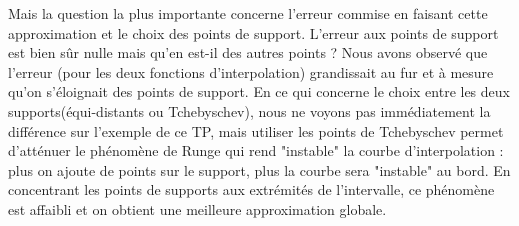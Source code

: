 \documentclass[a4paper,10pt]{report}
\begin{document}
\newline
\newline
Mais la question la plus importante concerne l’erreur commise en faisant cette approximation et le choix des points de support. L’erreur aux points de support est bien sûr nulle mais qu’en est-il des autres points ? 
\newline
\newline
Nous avons observé que l’erreur (pour les deux fonctions d'interpolation) grandissait au fur et à mesure qu’on s’éloignait des points de support. En ce qui concerne le choix entre les deux supports(équi-distants ou Tchebyschev), nous ne voyons pas immédiatement la différence sur l'exemple de ce TP, mais utiliser les points de Tchebyschev permet d'atténuer le phénomène de Runge qui rend "instable" la courbe d'interpolation : plus on ajoute de points sur le support, plus la courbe sera "instable" au bord. En concentrant les points de supports aux extrémités de l'intervalle, ce phénomène est affaibli et on obtient une meilleure approximation globale. 
\end{document}
